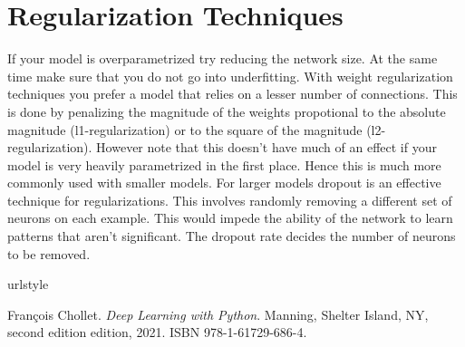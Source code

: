 \documentclass{../template/texnote}
\begin{document}
        \section{Regularization Techniques}
        If your model is overparametrized try reducing the network size. At the same time make sure that you do not go into underfitting.
        With weight regularization techniques you prefer a model that relies on a lesser number of connections.
        This is done by penalizing the magnitude of the weights propotional to the absolute magnitude (l1-regularization) or to the square of the magnitude (l2-regularization).
        However note that this doesn't have much of an effect if your model is very heavily parametrized in the first place. Hence this is much more commonly used with smaller models.
        For larger models dropout is an effective technique for regularizations.
        This involves randomly removing a different set of neurons on each example. This would impede the ability of the network to learn patterns that aren't significant.
        The dropout rate decides the number of neurons to be removed.
        \nocite{chollet_deep_2021}
\begin{thebibliography}{1}
\providecommand{\natexlab}[1]{#1}
\providecommand{\url}[1]{\texttt{#1}}
\expandafter\ifx\csname urlstyle\endcsname\relax
  \providecommand{\doi}[1]{doi: #1}\else
  \providecommand{\doi}{doi: \begingroup \urlstyle{rm}\Url}\fi

Fran{\c c}ois Chollet.
\newblock \emph{Deep Learning with {{Python}}}.
\newblock Manning, Shelter Island, NY, second edition edition, 2021.
\newblock ISBN 978-1-61729-686-4.

\end{thebibliography}
    \printbibliography
\end{document}
